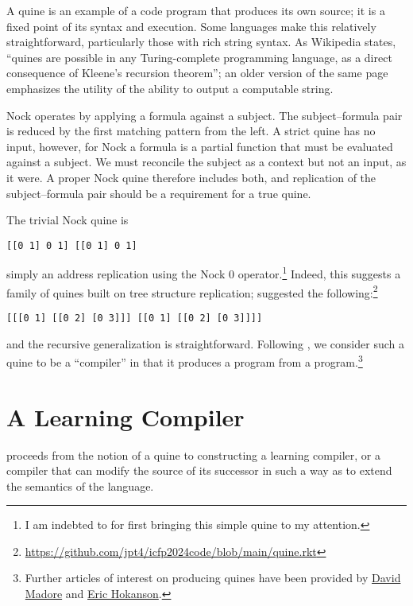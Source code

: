 \documentclass[twoside]{article}
\begin{document}
A quine is an example of a code program that produces its own source; it is a fixed point of its syntax and execution.  Some languages make this relatively straightforward, particularly those with rich string syntax.  As Wikipedia states, “quines are possible in any Turing-complete programming language, as a direct consequence of Kleene's recursion theorem”; an older version of the same page emphasizes the utility of the ability to output a computable string.

Nock operates by applying a formula against a subject.  The subject–formula pair is reduced by the first matching pattern from the left.  A strict quine has no input, however, for Nock a formula is a partial function that must be evaluated against a subject.  We must reconcile the subject as a context but not an input, as it were.  A proper Nock quine therefore includes both, and replication of the subject–formula pair should be a requirement for a true quine.

The trivial Nock quine is
\begin{lstlisting}[style=listingcode]
[[0 1] 0 1] [[0 1] 0 1]
\end{lstlisting}
\noindent
simply an address replication using the Nock 0 operator.\footnote{I am indebted to  for first bringing this simple quine to my attention.}  Indeed, this suggests a family of quines built on tree structure replication;  suggested the following:\footnote{\url{https://github.com/jpt4/icfp2024code/blob/main/quine.rkt}}

\begin{lstlisting}[style=listingcode]
[[[0 1] [[0 2] [0 3]]] [[0 1] [[0 2] [0 3]]]]
\end{lstlisting}

\noindent
and the recursive generalization is straightforward.  Following \citeauthor{Thompson1984}, we consider such a quine to be a “compiler” in that it produces a program from a program.\footnote{Further articles of interest on producing quines have been provided by \href{http://www.madore.org/~david/computers/quine.html}{David Madore} and \href{https://erichokanson.me/category/quine-programs/}{Eric Hokanson}.}

\section{A Learning Compiler}

\citeauthor{Thompson1984} proceeds from the notion of a quine to constructing a learning compiler, or a compiler that can modify the source of its successor in such a way as to extend the semantics of the language.
\end{document}
